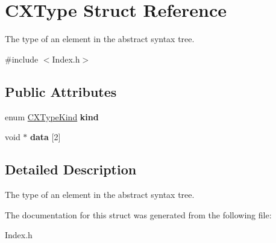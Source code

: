 \hypertarget{structCXType}{}\section{C\+X\+Type Struct Reference}
\label{structCXType}


The type of an element in the abstract syntax tree.  




{\ttfamily \#include $<$Index.\+h$>$}

\subsection*{Public Attributes}
\begin{DoxyCompactItemize}
\item 
\mbox{\label{structCXType_ab27a7510dc88b0ec80cff04ec89901aa}} 
enum \mbox{\hyperlink{group__CINDEX__TYPES_gaad39de597b13a18882c21860f92b095a}{C\+X\+Type\+Kind}} {\bfseries kind}
\item 
\mbox{\label{structCXType_ada63ea0defe2c7ace925b0d15df29aa9}} 
void $\ast$ {\bfseries data} \mbox{[}2\mbox{]}
\end{DoxyCompactItemize}


\subsection{Detailed Description}
The type of an element in the abstract syntax tree. 

The documentation for this struct was generated from the following file\+:\begin{DoxyCompactItemize}
\item 
Index.\+h\end{DoxyCompactItemize}
